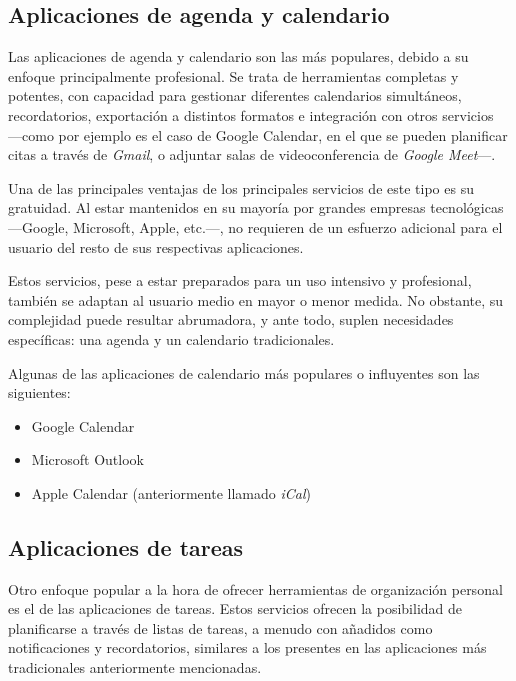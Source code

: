 \documentclass[10pt, a4paper]{aqademic}
\begin{document}
\subsection*{Aplicaciones de agenda y calendario}

Las aplicaciones de agenda y calendario son las más populares, debido a su enfoque principalmente profesional. Se trata de herramientas completas y potentes, con capacidad para gestionar diferentes calendarios simultáneos, recordatorios, exportación a distintos formatos e integración con otros servicios ---como por ejemplo es el caso de Google Calendar, en el que se pueden planificar citas a través de \textit{Gmail}, o adjuntar salas de videoconferencia de \textit{Google Meet}---. 

\medskip

Una de las principales ventajas de los principales servicios de este tipo es su gratuidad. Al estar mantenidos en su mayoría por grandes empresas tecnológicas ---Google, Microsoft, Apple, etc.---, no requieren de un esfuerzo adicional para el usuario del resto de sus respectivas aplicaciones.

\medskip

Estos servicios, pese a estar preparados para un uso intensivo y profesional, también se adaptan al usuario medio en mayor o menor medida. No obstante, su complejidad puede resultar abrumadora, y ante todo, suplen necesidades específicas: una agenda y un calendario tradicionales.

\medskip

Algunas de las aplicaciones de calendario más populares o influyentes son las siguientes:

\begin{itemize}
	\item Google Calendar
	\item Microsoft Outlook
	\item Apple Calendar (anteriormente llamado \textit{iCal})
\end{itemize}


\subsection*{Aplicaciones de tareas}

Otro enfoque popular a la hora de ofrecer herramientas de organización personal es el de las aplicaciones de tareas. Estos servicios ofrecen la posibilidad de planificarse a través de listas de tareas, a menudo con añadidos como notificaciones y recordatorios, similares a los presentes en las aplicaciones más tradicionales anteriormente mencionadas. 
\end{document}
